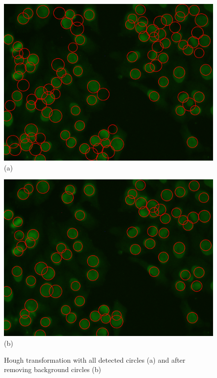 \begin{figure}
	\begin{minipage}[h]{0.49\linewidth}
		\begin{center}
			\includegraphics[scale=0.13]{Figures/segmentation/circles_no_selection}
			\\ (a)
		\end{center}	
	\end{minipage}
	\begin{minipage}[h]{0.49\linewidth}
		\begin{center}
			\includegraphics[scale=0.13]{Figures/segmentation/circles_after_selection}
			\\ (b)
		\end{center}
	\end{minipage}
	\caption{Hough transformation with all detected circles (a) and after removing background circles (b)}
	\label{fig:Hough}
\end{figure}

